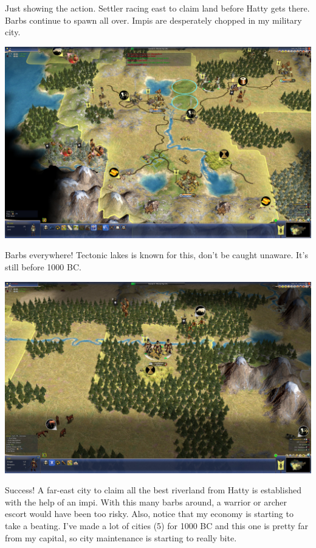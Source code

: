 \documentclass[10pt]{article}
\begin{document}
Just showing the action. Settler racing east to claim land before Hatty gets there. Barbs continue to spawn
all over. Impis are desperately chopped in my military city.

\includegraphics[width=1.0\textwidth]{39}

Barbs everywhere! Tectonic lakes is known for this, don't be caught unaware. It's still before 1000 BC.

\includegraphics[width=1.0\textwidth]{42}

Success! A far-east city to claim all the best riverland from Hatty is established with the help of
an impi. With this many barbs around, a warrior or archer escort would have been too risky. Also, notice
that my economy is starting to take a beating. I've made a lot of cities (5) for 1000 BC and this one is
pretty far from my capital, so city maintenance is starting to really bite.
\end{document}
